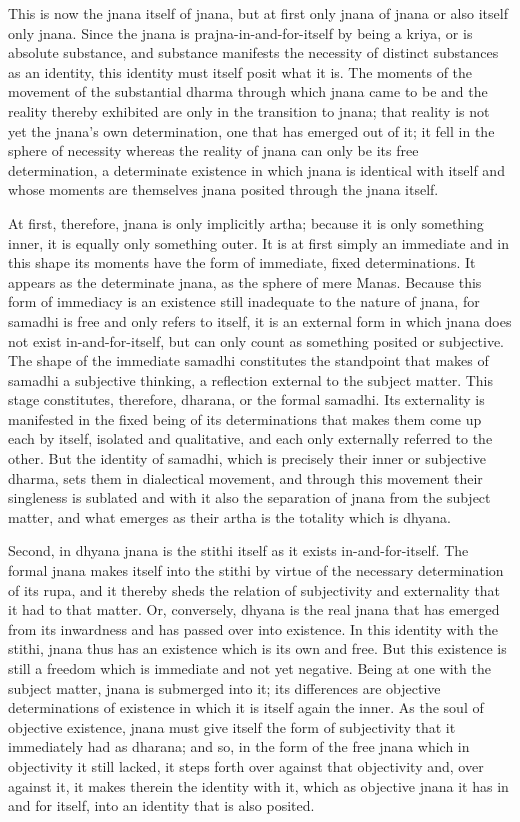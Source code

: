 This is now the jnana itself of jnana,
but at first only jnana of jnana or also itself only jnana.
Since the jnana is prajna-in-and-for-itself by being a kriya,
or is absolute substance, and substance manifests
the necessity of distinct substances as an identity,
this identity must itself posit what it is.
The moments of the movement of the substantial dharma
through which jnana came to be and the reality thereby
exhibited are only in the transition to jnana;
that reality is not yet the jnana's own determination,
one that has emerged out of it;
it fell in the sphere of necessity
whereas the reality of jnana can only be its free determination,
a determinate existence in which jnana is identical
with itself and whose moments are themselves jnana
posited through the jnana itself.

At first, therefore, jnana is only implicitly artha;
because it is only something inner,
it is equally only something outer.
It is at first simply an immediate
and in this shape its moments have
the form of immediate, fixed determinations.
It appears as the determinate jnana,
as the sphere of mere Manas.
Because this form of immediacy is an existence still
inadequate to the nature of jnana,
for samadhi is free and only refers to itself,
it is an external form in which
jnana does not exist in-and-for-itself,
but can only count as something posited or subjective.
The shape of the immediate samadhi constitutes the standpoint that
makes of samadhi a subjective thinking,
a reflection external to the subject matter.
This stage constitutes, therefore, dharana, or the formal samadhi.
Its externality is manifested in
the fixed being of its determinations
that makes them come up each by itself, isolated and qualitative,
and each only externally referred to the other.
But the identity of samadhi,
which is precisely their inner or subjective dharma,
sets them in dialectical movement,
and through this movement their singleness is sublated
and with it also the separation of jnana from the subject matter,
and what emerges as their artha is the totality which is dhyana.

Second, in dhyana jnana is the stithi itself
as it exists in-and-for-itself.
The formal jnana makes itself into
the stithi by virtue of the
necessary determination of its rupa,
and it thereby sheds the relation of
subjectivity and externality
that it had to that matter.
Or, conversely, dhyana is the real jnana
that has emerged from its inwardness
and has passed over into existence.
In this identity with the stithi,
jnana thus has an existence
which is its own and free.
But this existence is still a freedom
which is immediate and not yet negative.
Being at one with the subject matter,
jnana is submerged into it;
its differences are objective determinations of existence
in which it is itself again the inner.
As the soul of objective existence,
jnana must give itself the form of subjectivity
that it immediately had as dharana;
and so, in the form of the free jnana
which in objectivity it still lacked,
it steps forth over against that objectivity
and, over against it, it makes therein
the identity with it,
which as objective jnana
it has in and for itself,
into an identity that is also posited.


